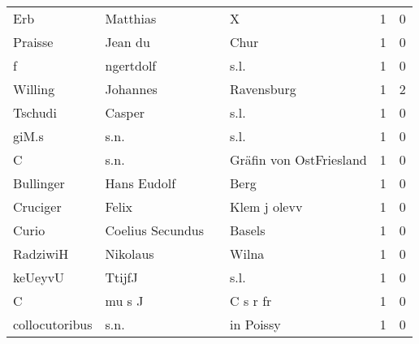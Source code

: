 \begin{center}
\begin{tiny}
\begin{longtabu}{llllrr}
                      Erb &                           Matthias &             &                                           X &          1 &         0 \\
                  Praisse &                            Jean du &             &                                        Chur &          1 &         0 \\
                        f &                          ngertdolf &             &                                        s.l. &          1 &         0 \\
                  Willing &                           Johannes &             &                                  Ravensburg &          1 &         2 \\
                  Tschudi &                             Casper &             &                                        s.l. &          1 &         0 \\
                    giM.s &                               s.n. &             &                                        s.l. &          1 &         0 \\
                        C &                               s.n. &             &                     Gräfin von OstFriesland &          1 &         0 \\
                Bullinger &                        Hans Eudolf &             &                                        Berg &          1 &         0 \\
                 Cruciger &                              Felix &             &                                Klem j olevv &          1 &         0 \\
                    Curio &                   Coelius Secundus &             &                                      Basels &          1 &         0 \\
                 RadziwiH &                           Nikolaus &             &                                       Wilna &          1 &         0 \\
                  keUeyvU &                             TtijfJ &             &                                        s.l. &          1 &         0 \\
                        C &                             mu s J &             &                                    C s r fr &          1 &         0 \\
           collocutoribus &                               s.n. &             &                                   in Poissy &          1 &         0 \\

\end{longtabu}
\end{tiny}
\end{center}
